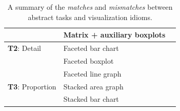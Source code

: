 \documentclass[journal]{vgtc}                %
\newcommand*\match{\textcolor{darkGreen}{\ding{52}}}
\newcommand*\mismatch{\textcolor{red}{\ding{54}}}
\begin{document}
\begin{table}[ht]
\begin{center}
\begin{tabular}{l|l|c}
        \cellcolor{nmYellow} %
        
        & \cellcolor{nmGreen} Matrix + auxiliary boxplots 
        
        & \match
        
        \\
        
        \hline
        
        \cellcolor{nmYellow} {\bf T2}: Detail 
        
        & \cellcolor{nmGreen} Faceted bar chart 
        
        & \match
        
        \\
        
        \cellcolor{nmYellow} %
        
        & \cellcolor{nmGreen} Faceted boxplot 
        
        & \mismatch
        
        \\
        
        \cellcolor{nmYellow} %
        
        & \cellcolor{nmGreen} Faceted line graph 
        
        & \match
        
        \\
        
        \hline
        
        \cellcolor{nmYellow} {\bf T3}: Proportion 
        
        & \cellcolor{nmGreen} Stacked area graph 
        
        & \match
        
        \\
        
        \cellcolor{nmYellow} %
        
        & \cellcolor{nmGreen} Stacked bar chart 
        
        & \match
        
        \\
        
        \hline  
        
    \end{tabular}
    \vspace{-0.15cm}
    \caption{A summary of the \textsl{matches} and \textsl{mismatches} between abstract tasks and visualization idioms.}
    \label{tab:matches-mismatches}
    \end{center}
    \vspace{-0.6cm}
\end{table}
\end{document}
